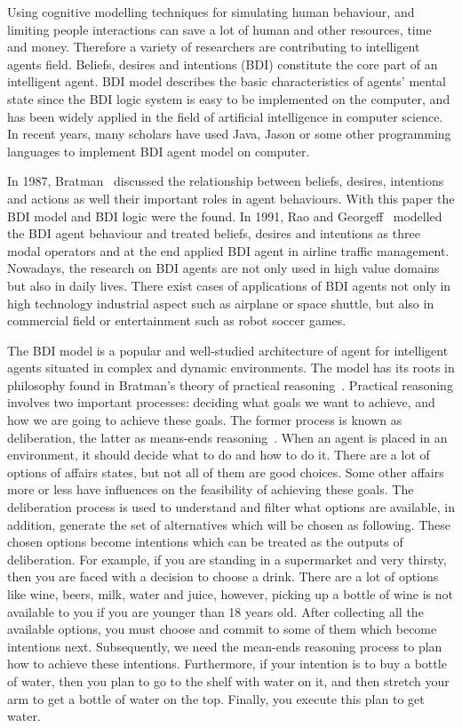 Using cognitive modelling techniques for simulating human behaviour, and limiting people interactions can save a lot of human and other resources, time and money. Therefore a variety of researchers are contributing to intelligent agents field. Beliefs, desires and intentions (BDI) constitute the core part of an intelligent agent. BDI model describes the basic characteristics of agents' mental state since the BDI logic system is easy to be implemented on the computer, and has been widely applied in the field of artificial intelligence in computer science. In recent years, many scholars have used Java, Jason or some other programming languages to implement BDI agent model on computer.

In 1987, Bratman~\cite{MICHAEL_PlansResource_1988} discussed the relationship between beliefs, desires, intentions and actions as well their important roles in agent behaviours. With this paper the BDI model and BDI logic were the found. In 1991, Rao and Georgeff~\cite{Michael_BDIAgency_1999} modelled the BDI agent behaviour and treated beliefs, desires and intentions as three modal operators and at the end applied BDI agent in airline traffic management. Nowadays, the research on BDI agents are not only used in high value domains but also in daily lives. There exist cases of applications of BDI agents not only in high technology industrial aspect such as airplane or space shuttle, but also in commercial field or entertainment such as robot soccer games.

The BDI model is a popular and well-studied architecture of agent for intelligent agents situated in complex and dynamic environments. The model has its roots in philosophy found in Bratman’s theory of practical reasoning~\cite{Sebastian_Hierarchical_2006}. Practical reasoning involves two important processes: deciding what goals we want to achieve, and how we are going to achieve these goals. The former process is known as deliberation, the latter as means-ends reasoning~\cite{Gerhard_MultiSystem_1999}. When an agent is placed in an environment, it should decide what to do and how to do it. There are a lot of options of affairs states, but not all of them are good choices. Some other affairs more or less have influences on the feasibility of achieving these goals. The deliberation process is used to understand and filter what options are available, in addition, generate the set of alternatives which will be chosen as following. These chosen options become intentions which can be treated as the outputs of deliberation. For example, if you are standing in a supermarket and very thirsty, then you are faced with a decision to choose a drink. There are a lot of options like wine, beers, milk, water and juice, however, picking up a bottle of wine is not available to you if you are younger than 18 years old. After collecting all the available options, you must choose and commit to some of them which become intentions next. Subsequently, we need the mean-ends reasoning process to plan how to achieve these intentions. Furthermore, if your intention is to buy a bottle of water, then you plan to go to the shelf with water on it, and then stretch your arm to get a bottle of water on the top. Finally, you execute this plan to get water.

